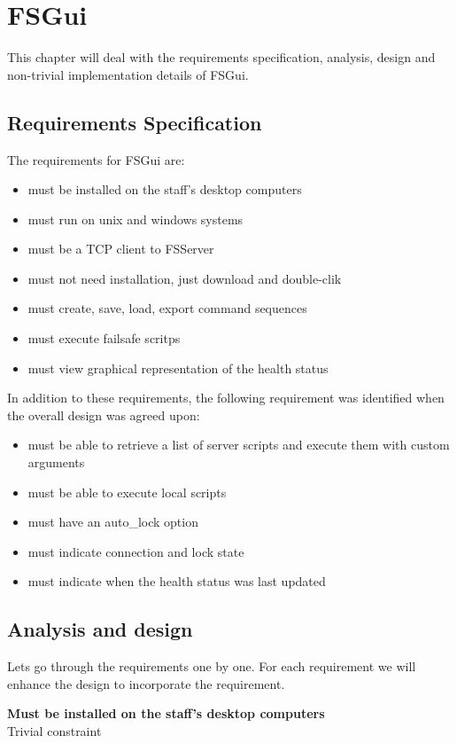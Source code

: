\chapter{FSGui}
\label{chap:fsgui}
This chapter will deal with the requirements specification, analysis, design and non-trivial implementation details of FSGui.

\section{Requirements Specification}
The requirements for FSGui are:
\begin{itemize}
	\item must be installed on the staff's desktop computers
	\item must run on unix and windows systems
	\item must be a TCP client to FSServer
	\item must not need installation, just download and double-clik
	\item must create, save, load, export command sequences
	\item must execute failsafe scritps
	\item must view graphical representation of the health status
\end{itemize}
In addition to these requirements, the following requirement was identified when the overall design was agreed upon:
\begin{itemize}
	\item must be able to retrieve a list of server scripts and execute them with custom arguments
	\item must be able to execute local scripts
	\item must have an auto\_lock option
	\item must indicate connection and lock state
	\item must indicate when the health status was last updated
\end{itemize}

\section{Analysis and design}
Lets go through the requirements one by one. For each requirement we will enhance the design to incorporate the requirement.

\textbf{Must be installed on the staff's desktop computers} \\
Trivial constraint

